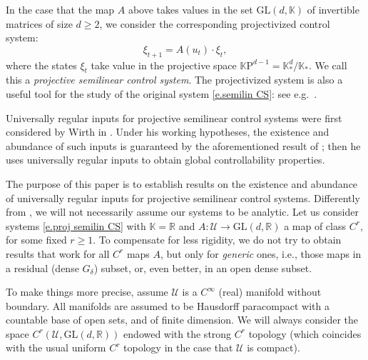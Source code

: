 \documentclass[10pt, a4paper]{amsart}
\theoremstyle{plain}
\theoremstyle{definition}
\theoremstyle{remark}
\theoremstyle{note}
\numberwithin{equation}{section}
\begin{document}
In the case that the map $A$ above takes values in the set ${\mathrm{GL}}(d,{\mathbb{K}})$ of invertible matrices
of size $d \ge 2$, we consider the corresponding projectivized control system:
\begin{equation}\label{e.proj semilin CS}
\xi_{t+1} = A(u_t) \cdot \xi_t, 
\end{equation}
where the states $\xi_t$ take value in the projective space ${\mathbb{K}\mathrm{P}}^{d-1} = {\mathbb{K}}^d_* / {\mathbb{K}}_*$.
We call this a \emph{projective semilinear control system}.
The projectivized system is also a useful tool
for the study of the original system \eqref{e.semilin CS}:
see e.g.\ \cite{Wirth_98,CK_book}.

Universally regular inputs for projective semilinear control systems
were first considered by Wirth in \cite{Wirth_98}.
Under his working hypotheses, the existence and abundance of such inputs 
is guaranteed by the aforementioned result of \cite{Sontag_Wirth_98};
then he uses universally regular inputs to obtain global controllability properties.

\medskip

The purpose of this paper is to establish results on the existence and abundance of 
universally regular inputs for projective semilinear control systems. 
Differently from \cite{Sontag_Wirth_98, Wirth_98}, we will not necessarily assume our systems to be analytic.
Let us consider systems \eqref{e.proj semilin CS} with ${\mathbb{K}}={\mathbb{R}}$ 
and $A \colon {\mathcal{U}} \to {\mathrm{GL}}(d,{\mathbb{R}})$ a map of class $C^r$, for some fixed $r\ge 1$.
To compensate for less rigidity, we do not try to obtain results that work for all $C^r$ maps $A$, 
but only for \emph{generic} ones, i.e., those maps in a residual (dense $G_\delta$) 
subset, or, even better, in an open dense subset.

To make things more precise, assume ${\mathcal{U}}$ is a $C^\infty$ (real) manifold without boundary.
All manifolds are assumed to be Hausdorff paracompact with a countable base of open sets, and of finite dimension.
We will always consider the space $C^r({\mathcal{U}}, {\mathrm{GL}}(d,{\mathbb{R}}))$ endowed with the strong $C^r$ topology
(which coincides with the usual uniform $C^r$ topology in the case that ${\mathcal{U}}$ is compact).
\end{document}
